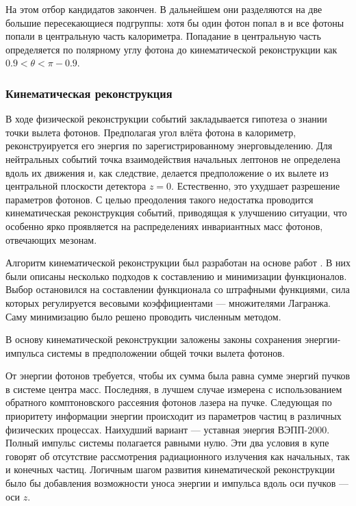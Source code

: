 На этом отбор кандидатов закончен. 
В дальнейшем они разделяются на две большие пересекающиеся подгруппы: 
хотя бы один фотон попал в  и все фотоны попали в центральную часть калориметра.
Попадание в центральную часть определяется по полярному углу фотона до кинематической реконструкции как $0.9 < \theta < \pi - 0.9$.



\subsubsection{Кинематическая реконструкция}
\label{sec:kf}

В ходе физической реконструкции событий закладывается гипотеза о знании точки вылета фотонов.
Предполагая угол влёта фотона в калориметр,
реконструируется его энергия по зарегистрированному энерговыделению.
Для нейтральных событий точка взаимодействия начальных лептонов не определена вдоль их движения и,
как следствие,
делается предположение о их вылете из центральной плоскости детектора $z = 0$.
Естественно,
это ухудшает разрешение параметров фотонов.
С целью преодоления такого недостатка проводится кинематическая реконструкция событий,
приводящая к улучшению ситуации,
что особенно ярко проявляется на распределениях инвариантных масс фотонов,
отвечающих мезонам.

Алгоритм кинематической реконструкции был разработан на основе работ \cite{Bukin2003-27, Bukin2005-51, Bukin2008-3}.
В них были описаны несколько подходов к составлению и минимизации функционалов.
Выбор остановился на составлении функционала со штрафными функциями,
сила которых регулируется весовыми коэффициентами
---
множителями Лагранжа.
Саму минимизацию было решено проводить численным методом.

В основу кинематической реконструкции заложены законы сохранения энергии-импульса системы в предположении общей точки вылета фотонов.

От энергии фотонов требуется, чтобы их сумма была равна сумме энергий пучков в системе центра масс. Последняя, в лучшем случае измерена с использованием обратного комптоновского рассеяния фотонов лазера на пучке. Следующая по приоритету информации энергии происходит из параметров частиц в различных физических процессах. Наихудший вариант --- уставная энергия ВЭПП-2000. Полный импульс системы полагается равными нулю. Эти два условия в купе говорят об отсутствие рассмотрения радиационного излучения как начальных, так и конечных частиц.
Логичным шагом развития кинематической реконструкции было бы добавления возможности уноса энергии и импульса вдоль оси пучков --- оси $z$.

